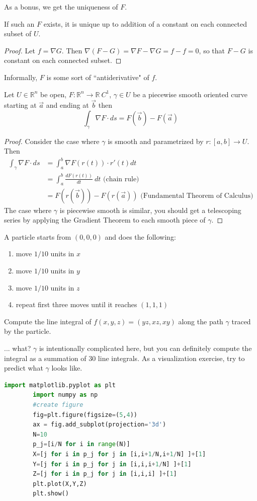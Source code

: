 \documentclass[11pt,openany]{book}
\newcommand{\proposition}[1]{\begin{tcolorbox}[title=Proposition,colframe=red!50!blue!20!white,colback=red!35!blue!10!white, coltitle=black]{#1}\end{tcolorbox}
}
\newcommand{\theorem}[2]{\begin{tcolorbox}[title=Theorem ({#1}),colframe=red!70!black,colback=red!5!white]{#2}\end{tcolorbox}
}
\newcommand{\example}[1]{\begin{tcolorbox}[title=Example,colframe=yellow!50!white,colback=yellow!20!white,coltitle=black]{#1}\end{tcolorbox}
}
\begin{document}
	
	As a bonus, we get the uniqueness of $F$.
	\proposition{
		If such an $F$ exists, it is unique up to addition of a constant on each connected subset of $U$.
	}
	
	\begin{proof}
		Let $f=\nabla G$. Then $\nabla(F-G)=\nabla F - \nabla G = f-f =0$, so that $F-G$ is constant on each connected subset.
	\end{proof}
	Informally, $F$ is some sort of ``antiderivative" of $f$.
	\theorem{Gradient}{
		Let $U\in\mathbb{R}^n$ be open, $F:\mathbb{R}^n\to\mathbb{R} \ C^1$, $\gamma\in U$ be a piecewise smooth oriented curve starting at $\vec{a}$ and ending at $\vec{b}$
		then \[
		\int_\gamma \nabla F \cdot ds = F(\vec{b})-F(\vec{a})
		\]
	}
	\begin{proof}
		Consider the case where $\gamma$ is smooth and parametrized by $r:[a,b]\to U$. Then
		\begin{align*}
			\int_\gamma \nabla F \cdot ds &= \int_a^b \nabla F(r(t)) \cdot r'(t) dt \\
			&= \int_a^b \frac{d F(r(t))}{dt} \ dt \textrm{ (chain rule)}\\
			&= F(r(\vec{b})) - F(r(\vec{a})) \textrm{ (Fundamental Theorem of Calculus)}
		\end{align*} 
		The case where $\gamma$ is piecewise smooth is similar, you should get a telescoping series by applying the Gradient Theorem to each smooth piece of $\gamma$.
	\end{proof}
	\example{
		A particle starts from $(0,0,0)$ and does the following:
		\begin{enumerate}
			\item move $1/10$ units in $x$
			\item move $1/10$ units in $y$
			\item move $1/10$ units in $z$
			\item repeat first three moves until it reaches $(1,1,1)$
		\end{enumerate}
		Compute the line integral of $f(x,y,z)= (yz,xz,xy)$ along the path $\gamma$ traced by the particle.
	}
	... what? $\gamma$ is intentionally complicated here, but you can definitely compute the integral as a summation of $30$ line integrals.
	As a visualization exercise, try to predict what $\gamma$ looks like.
	
	\begin{lstlisting}[language=Python]
		import matplotlib.pyplot as plt
		import numpy as np
		#create figure
		fig=plt.figure(figsize=(5,4))
		ax = fig.add_subplot(projection='3d')
		N=10
		p_j=[i/N for i in range(N)]
		X=[j for i in p_j for j in [i,i+1/N,i+1/N] ]+[1]
		Y=[j for i in p_j for j in [i,i,i+1/N] ]+[1]
		Z=[j for i in p_j for j in [i,i,i] ]+[1]
		plt.plot(X,Y,Z)
		plt.show()
	\end{lstlisting}
	
\end{document}
